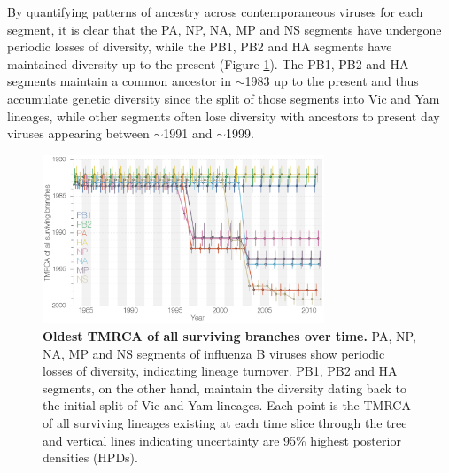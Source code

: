 \documentclass[11pt,oneside,letterpaper]{article}
\begin{document}
By quantifying patterns of ancestry across contemporaneous viruses for each segment, it is clear that the PA, NP, NA, MP and NS segments have undergone periodic losses of diversity, while the PB1, PB2 and HA segments have maintained diversity up to the present (Figure \ref{tmrcaOT}).
The PB1, PB2 and HA segments maintain a common ancestor in $\sim$1983 up to the present and thus accumulate genetic diversity since the split of those segments into Vic and Yam lineages, while other segments often lose diversity with ancestors to present day viruses appearing between $\sim$1991 and $\sim$1999.

\begin{figure}[h]
	\centering		
	\includegraphics[width=0.75\textwidth]{figures/InfB_tmrcaOT_lines.png}
	\caption{\textbf{Oldest TMRCA of all surviving branches over time.}
PA, NP, NA, MP and NS segments of influenza B viruses show periodic losses of diversity, indicating lineage turnover.
PB1, PB2 and HA segments, on the other hand, maintain the diversity dating back to the initial split of Vic and Yam lineages.
Each point is the TMRCA of all surviving lineages existing at each time slice through the tree and vertical lines indicating uncertainty are 95\% highest posterior densities (HPDs).}
	\label{tmrcaOT}
\end{figure}
\end{document}
